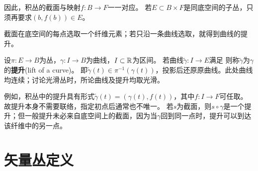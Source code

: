 因此，积丛的截面与映射$f:B\to F$一一对应。
若$E\subset B\times F$是同底空间的子丛，只须再要求$(b,f(b))\in E$。

截面在底空间的每点选取一个纤维元素；若只沿一条曲线选取，就得到曲线的提升。
\begin{definition}\label{chfb:def_curve-lift}
    设$\pi:E\to B$为丛，$\gamma:I\to B$为曲线，$I\subset\mathbb{R}$为区间。
    若曲线$\widetilde\gamma:I\to E$满足
    \eq{\pi\circ\widetilde\gamma=\gamma,}
    则称$\widetilde\gamma$为$\gamma$的\textbf{提升}(lift of a curve)。
    即$\widetilde\gamma(t)\in\pi^{-1}(\gamma(t))$，投影后还原原曲线。此处曲线均连续；讨论光滑丛时，所论曲线及提升均取光滑。
\end{definition}

例如，积丛中的提升具有形式$\widetilde\gamma(t)=(\gamma(t),f(t))$，其中$f:I\to F$可任取。
故提升本身不需要联络，指定初点后通常也不唯一。
若$s$为截面，则$s\circ\gamma$是一个提升；但一般提升未必来自底空间上的截面，因为当$\gamma$回到同一点时，提升可以到达该纤维中的另一点。

\section{矢量丛定义}

